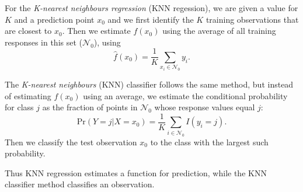 
For the \textit{K-nearest neighbours regression} (KNN regession), we are given a value
for $K$ and a prediction point $x_0$ and we first identify the $K$ training observations
that are closest to $x_0$. Then we estimate $f(x_0)$ using the average of all training
responses in this set ($\mathcal{N}_0$), using
\[
    \hat{f}(x_0) = \frac{1}{K}\sum_{x_i \in \mathcal{N}_0}{y_i}.
\]

The \textit{K-nearest neighbours} (KNN) classifier follows the same method, but instead
of estimating $f(x_0)$ using an average, we estimate the conditional probability for
class $j$ as the fraction of points in $\mathcal{N}_0$ whose response values equal $j$:
\[
    \text{Pr}(Y = j \vert X = x_0) = \frac{1}{K} \sum_{i \in \mathcal{N}_0} I(y_i = j).
\]
Then we classify the test observation $x_0$ to the class with the largest such 
probability.

Thus KNN regression estimates a function for prediction, while the KNN classifier method
classifies an observation.
